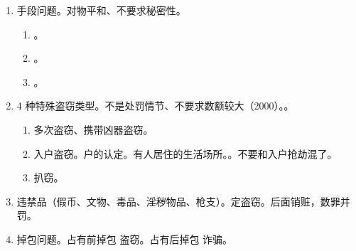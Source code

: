 \begin{enumerate}
\begin{enumerate}
\begin{enumerate}
                        \begin{enumerate}
                          \item {}。。
                          \item 家里杀，家里拿 \yjt 盗窃。
                          \item 当场杀，过后拿 \yjt 一律定侵占。
                          \item 当场杀，第三人拿 \yjt 侵占。
                        \end{enumerate}
                \end{enumerate}
        \end{enumerate}
  \item 手段问题。对物平和、不要求秘密性。
        \begin{enumerate}
          \item {}。
          \item {}。
          \item {}。
        \end{enumerate}
  \item 4 种特殊盗窃类型。不是处罚情节、不要求数额较大（2000）。。
        \begin{enumerate}
          \item 多次盗窃、携带凶器盗窃。
          \item 入户盗窃。户的认定。有人居住的生活场所。。不要和入户抢劫混了。
          \item 扒窃。
        \end{enumerate}
  \item 违禁品（假币、文物、毒品、淫秽物品、枪支）。定盗窃。后面销赃，数罪并罚。
  \item 掉包问题。\yi 占有前掉包 \yjt 盗窃。\er 占有后掉包 \yjt 诈骗。
\end{enumerate}
